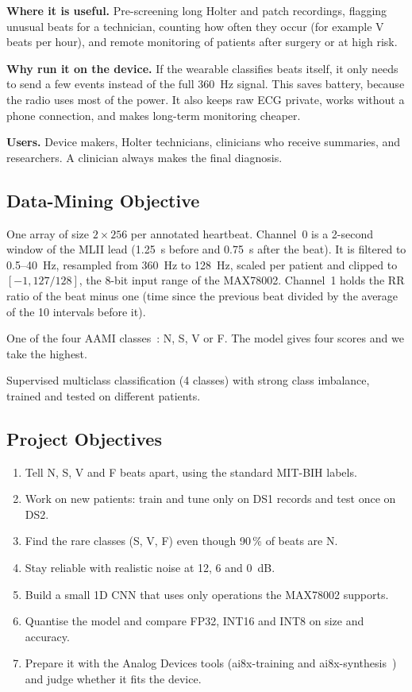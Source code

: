 \documentclass[11pt,a4paper]{article}
\begin{document}
\textbf{Where it is useful.} Pre-screening long Holter and patch recordings, flagging unusual beats for a technician, counting how often they occur (for example V beats per hour), and remote monitoring of patients after surgery or at high risk.

\textbf{Why run it on the device.} If the wearable classifies beats itself, it only needs to send a few events instead of the full 360~Hz signal. This saves battery, because the radio uses most of the power. It also keeps raw ECG private, works without a phone connection, and makes long-term monitoring cheaper.

\textbf{Users.} Device makers, Holter technicians, clinicians who receive summaries, and researchers. A clinician always makes the final diagnosis.

\subsection{Data-Mining Objective}

\begin{description}[leftmargin=2.2cm,style=nextline]
  \item[Input] One array of size $2 \times 256$ per annotated heartbeat.
  Channel~0 is a 2-second window of the MLII lead (1.25~s before and 0.75~s after the beat). It is filtered to 0.5--40~Hz, resampled from 360~Hz to 128~Hz, scaled per patient and clipped to $[-1, 127/128]$, the 8-bit input range of the MAX78002.
  Channel~1 holds the RR ratio of the beat minus one (time since the previous beat divided by the average of the 10 intervals before it).
  \item[Output] One of the four AAMI classes~\citep{aami2012ec57}: N, S, V or F. The model gives four scores and we take the highest.
  \item[Type of task] Supervised multiclass classification (4 classes) with strong class imbalance, trained and tested on different patients.
\end{description}

\subsection{Project Objectives}
\begin{enumerate}
  \item Tell N, S, V and F beats apart, using the standard MIT-BIH labels.
  \item Work on new patients: train and tune only on DS1 records and test once on DS2.
  \item Find the rare classes (S, V, F) even though 90\,\% of beats are N.
  \item Stay reliable with realistic noise at 12, 6 and 0~dB.
  \item Build a small 1D CNN that uses only operations the MAX78002 supports.
  \item Quantise the model and compare FP32, INT16 and INT8 on size and accuracy.
  \item Prepare it with the Analog Devices tools (ai8x-training and ai8x-synthesis~\citep{adi_ai8x_training,adi_ai8x_synthesis}) and judge whether it fits the device.
\end{enumerate}
\end{document}
